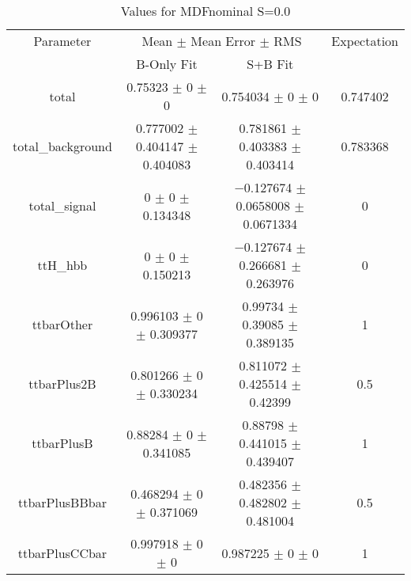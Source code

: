 \begin{table}
\centering
\caption{Values for MDFnominal S=0.0}
\begin{tabular}{cccc}
\toprule
Parameter & \multicolumn{2}{c}{Mean $\pm$ Mean Error $\pm$ RMS} & Expectation\\
 & B-Only Fit & S+B Fit & \\
\midrule
total & \num{0.75323} $\pm$ \num{0} $\pm$ \num{0} & \num{0.754034} $\pm$ \num{0} $\pm$ \num{0} & \num{0.747402}\\
total\_background & \num{0.777002} $\pm$ \num{0.404147} $\pm$ \num{0.404083} & \num{0.781861} $\pm$ \num{0.403383} $\pm$ \num{0.403414} & \num{0.783368}\\
total\_signal & \num{0} $\pm$ \num{0} $\pm$ \num{0.134348} & \num{-0.127674} $\pm$ \num{0.0658008} $\pm$ \num{0.0671334} & \num{0}\\
ttH\_hbb & \num{0} $\pm$ \num{0} $\pm$ \num{0.150213} & \num{-0.127674} $\pm$ \num{0.266681} $\pm$ \num{0.263976} & \num{0}\\
ttbarOther & \num{0.996103} $\pm$ \num{0} $\pm$ \num{0.309377} & \num{0.99734} $\pm$ \num{0.39085} $\pm$ \num{0.389135} & \num{1}\\
ttbarPlus2B & \num{0.801266} $\pm$ \num{0} $\pm$ \num{0.330234} & \num{0.811072} $\pm$ \num{0.425514} $\pm$ \num{0.42399} & \num{0.5}\\
ttbarPlusB & \num{0.88284} $\pm$ \num{0} $\pm$ \num{0.341085} & \num{0.88798} $\pm$ \num{0.441015} $\pm$ \num{0.439407} & \num{1}\\
ttbarPlusBBbar & \num{0.468294} $\pm$ \num{0} $\pm$ \num{0.371069} & \num{0.482356} $\pm$ \num{0.482802} $\pm$ \num{0.481004} & \num{0.5}\\
ttbarPlusCCbar & \num{0.997918} $\pm$ \num{0} $\pm$ \num{0} & \num{0.987225} $\pm$ \num{0} $\pm$ \num{0} & \num{1}\\
\bottomrule
\end{tabular}
\end{table}